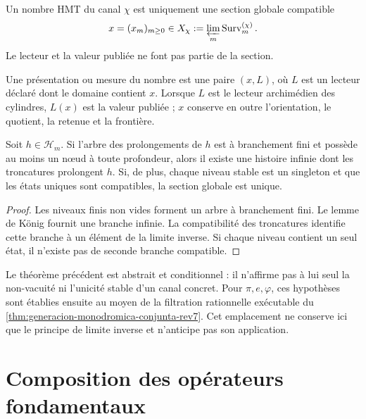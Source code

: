\begin{definition}
\label{def:numero-hmt-tpk-completo}
Un nombre HMT du canal \(\chi\) est uniquement une section globale
compatible
\[
 x=(x_m)_{m\geq0}\in
 X_\chi:=\varprojlim_m\operatorname{Surv}_m^{(\chi)}.
\]
Le lecteur et la valeur publiée ne font pas partie de la section.
\end{definition}

Une présentation ou mesure du nombre est une paire \((x,L)\), où
\(L\) est un lecteur déclaré dont le domaine contient \(x\). Lorsque \(L\) est le
lecteur archimédien des cylindres, \(L(x)\) est la valeur publiée ; \(x\)
conserve en outre l'orientation, le quotient, la retenue et la frontière.

\begin{theorem}
\label{thm:prolongacion-global-tpk-completo}
Soit \(h\in\mathcal H_m\). Si l'arbre des prolongements de \(h\) est
à branchement fini et possède au moins un nœud à toute profondeur, alors
il existe une histoire infinie dont les troncatures prolongent \(h\). Si, de plus,
chaque niveau stable est un singleton et que les états uniques sont compatibles, la
section globale est unique.
\end{theorem}
\begin{proof}
Les niveaux finis non vides forment un arbre à branchement fini. Le
lemme de König fournit une branche infinie. La compatibilité des
troncatures identifie cette branche à un élément de la limite inverse. Si
chaque niveau contient un seul état, il n'existe pas de seconde branche compatible.
\end{proof}

Le théorème précédent est abstrait et conditionnel : il n'affirme pas à lui seul la
non-vacuité ni l'unicité stable d'un canal concret. Pour
\(\pi,e,\varphi\), ces hypothèses sont établies ensuite au moyen de la filtration
rationnelle exécutable du
\cref{thm:generacion-monodromica-conjunta-rev7}. Cet emplacement ne conserve
ici que le principe de limite inverse et n'anticipe pas son application.

\section{Composition des opérateurs fondamentaux}

